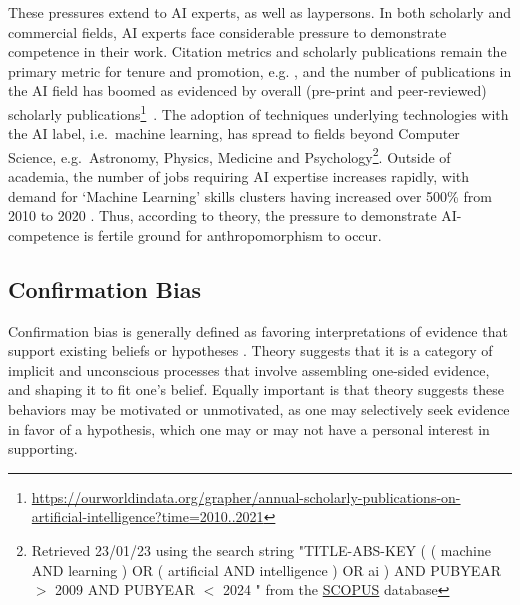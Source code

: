 \documentclass{article}
\theoremstyle{plain}
\theoremstyle{definition}
\theoremstyle{remark}
\begin{document}
These pressures extend to AI experts, as well as laypersons. In both scholarly and commercial fields, AI experts face considerable pressure to demonstrate competence in their work. Citation metrics and scholarly publications remain the primary metric for tenure and promotion, e.g. \cite{alperin2019significant}, and the number of publications in the AI field has boomed as evidenced by overall (pre-print and peer-reviewed) scholarly publications\footnote{\url{https://ourworldindata.org/grapher/annual-scholarly-publications-on-artificial-intelligence?time=2010..2021} }~\cite{Maslej2023-pi}.
The adoption of techniques underlying technologies with the AI label, i.e.\ machine learning, has spread to fields beyond Computer Science, e.g.\ Astronomy, Physics, Medicine and Psychology\footnote{Retrieved 23/01/23 using the search string "TITLE-ABS-KEY ( ( machine  AND  learning )  OR  ( artificial  AND  intelligence )  OR  ai )  AND  PUBYEAR  $>$  2009  AND  PUBYEAR  $<$  2024 " from the \href{https://www.scopus.com/}{SCOPUS} database}. Outside of academia, the number of jobs requiring AI expertise increases rapidly,
with demand for `Machine Learning' skills clusters having increased over 500\% from 2010 to 2020 \cite{Maslej2023-pi}. Thus, according to theory, the pressure to demonstrate AI-competence is fertile ground for anthropomorphism to occur. 


\subsection{Confirmation Bias}

Confirmation bias is generally defined as favoring interpretations of evidence that support existing beliefs or hypotheses \cite{nickerson1998confirmation}.
Theory suggests that it is a category of implicit and unconscious processes that involve assembling one-sided evidence, and shaping it to fit one's belief. Equally important is that theory suggests these behaviors may be motivated or unmotivated, as one may selectively seek
evidence in favor of a hypothesis, which one may or may not have a personal interest in supporting.
\end{document}
